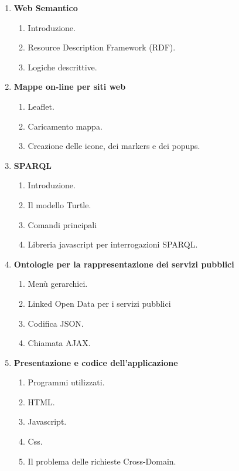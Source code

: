 \documentclass[a4paper,11pt]{article}
\begin{document}
\begin{enumerate}
	\item \LARGE{\textbf{Web Semantico}}
		\begin{enumerate}[label*=\arabic*.]
			\Large
			\item Introduzione.
			\item Resource Description Framework (RDF).
			\item Logiche descrittive.
		\end{enumerate}
	\bigskip
	\item \LARGE{\textbf{Mappe on-line per siti web}}
		\begin{enumerate}[label*=\arabic*.]
			\Large
			\item Leaflet.
			\item Caricamento mappa.
			\item Creazione delle icone, dei markers e dei popups.
		\end{enumerate}
	\bigskip 
	\item \LARGE{\textbf{SPARQL}}
		\begin{enumerate}[label*=\arabic*.]
			\Large
			\item Introduzione.
			\item Il modello Turtle.
			\item Comandi principali
			\item Libreria javascript per interrogazioni SPARQL.
		\end{enumerate}
	\bigskip 
	\item \LARGE{\textbf{Ontologie per la rappresentazione dei servizi pubblici}}
		\begin{enumerate}[label*=\arabic*.]
			\Large
			\item Menù gerarchici.
			\item Linked Open Data per i servizi pubblici
			\item Codifica JSON.
			\item Chiamata AJAX.
		\end{enumerate}
	\bigskip 
	\item \LARGE{\textbf{Presentazione e codice dell'applicazione}}
		\begin{enumerate}[label*=\arabic*.]
			\Large
			\item Programmi utilizzati.
			\item HTML.
			\item Javascript.
			\item Css.
			\item Il problema delle richieste Cross-Domain.
		\end{enumerate}
\end{enumerate}
\bigskip 
		
\end{document}

